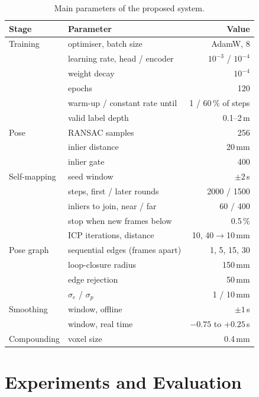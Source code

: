 \documentclass[9pt,shortpaper,twoside,web]{ieeecolor2}
\begin{document}
\begin{table}[t]
  \caption{Main parameters of the proposed system.}
  \label{tab:params}
  \centering
  \begin{tabular}{@{}llr@{}}
    \toprule
    Stage & Parameter & Value\\
    \midrule
    Training & optimiser, batch size & AdamW, 8\\
     & learning rate, head / encoder & $10^{-3}$ / $10^{-4}$\\
     & weight decay & $10^{-4}$\\
     & epochs & 120\\
     & warm-up / constant rate until & 1 / 60\,\% of steps\\
     & valid label depth & 0.1--2\,m\\
    \midrule
    Pose & RANSAC samples & 256\\
     & inlier distance & 20\,mm\\
     & inlier gate & 400\\
    \midrule
    Self-mapping & seed window & $\pm2$\,s\\
     & steps, first / later rounds & 2000 / 1500\\
     & inliers to join, near / far & 60 / 400\\
     & stop when new frames below & 0.5\,\%\\
     & ICP iterations, distance & 10, 40$\to$10\,mm\\
    \midrule
    Pose graph & sequential edges (frames apart) & 1, 5, 15, 30\\
     & loop-closure radius & 150\,mm\\
     & edge rejection & 50\,mm\\
     & $\sigma_e$ / $\sigma_p$ & 1 / 10\,mm\\
    \midrule
    Smoothing & window, offline & $\pm1$\,s\\
     & window, real time & $-0.75$ to $+0.25$\,s\\
    \midrule
    Compounding & voxel size & 0.4\,mm\\
    \bottomrule
  \end{tabular}
\end{table}




\section{Experiments and Evaluation}
\label{sec:experiments}
\end{document}
